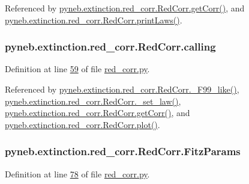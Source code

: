 \begin{DoxyVerb}
Referenced by \hyperlink{red__corr_8py_source_l00211}{pyneb.\+extinction.\+red\+\_\+corr.\+Red\+Corr.\+get\+Corr()}, and \hyperlink{red__corr_8py_source_l00134}{pyneb.\+extinction.\+red\+\_\+corr.\+Red\+Corr.\+print\+Laws()}.

\hypertarget{classpyneb_1_1extinction_1_1red__corr_1_1_red_corr_a30606dfd94b4cefefd10dbb1f7cbd473}{}
\subsubsection[{calling}]{\setlength{\rightskip}{0pt plus 5cm}pyneb.\+extinction.\+red\+\_\+corr.\+Red\+Corr.\+calling}\label{classpyneb_1_1extinction_1_1red__corr_1_1_red_corr_a30606dfd94b4cefefd10dbb1f7cbd473}


Definition at line \hyperlink{red__corr_8py_source_l00059}{59} of file \hyperlink{red__corr_8py_source}{red\+\_\+corr.\+py}.



Referenced by \hyperlink{red__corr_8py_source_l00658}{pyneb.\+extinction.\+red\+\_\+corr.\+Red\+Corr.\+\_\+\+F99\+\_\+like()}, \hyperlink{red__corr_8py_source_l00176}{pyneb.\+extinction.\+red\+\_\+corr.\+Red\+Corr.\+\_\+set\+\_\+law()}, \hyperlink{red__corr_8py_source_l00211}{pyneb.\+extinction.\+red\+\_\+corr.\+Red\+Corr.\+get\+Corr()}, and \hyperlink{red__corr_8py_source_l00303}{pyneb.\+extinction.\+red\+\_\+corr.\+Red\+Corr.\+plot()}.

\hypertarget{classpyneb_1_1extinction_1_1red__corr_1_1_red_corr_a133fcc7513d358e629266b24cbe7bebc}{}
\subsubsection[{Fitz\+Params}]{\setlength{\rightskip}{0pt plus 5cm}pyneb.\+extinction.\+red\+\_\+corr.\+Red\+Corr.\+Fitz\+Params}\label{classpyneb_1_1extinction_1_1red__corr_1_1_red_corr_a133fcc7513d358e629266b24cbe7bebc}


Definition at line \hyperlink{red__corr_8py_source_l00078}{78} of file \hyperlink{red__corr_8py_source}{red\+\_\+corr.\+py}.




\end{DoxyVerb}
